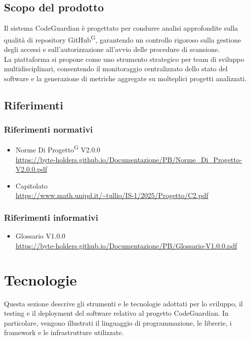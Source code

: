 \documentclass[a4paper, 11pt]{article}
\begin{document}
\subsection{Scopo del prodotto}
Il sistema CodeGuardian è progettato per condurre analisi approfondite sulla qualità di repository GitHub\textsuperscript{G}, garantendo un controllo rigoroso sulla gestione degli accessi e sull'autorizzazione all'avvio delle procedure di scansione.
\\
La piattaforma si propone come uno strumento strategico per team di sviluppo multidisciplinari, consentendo il monitoraggio centralizzato dello stato del software e la generazione di metriche aggregate su molteplici progetti analizzati.

\subsection{Riferimenti}
\subsubsection{Riferimenti normativi}
\begin{itemize}
  \item
    Norme Di Progetto\textsuperscript{G} V2.0.0\\
    \url{https://byte-holders.github.io/Documentazione/PB/Norme_Di_Progetto-V2.0.0.pdf}
  \item
    Capitolato\\
    \url{https://www.math.unipd.it/~tullio/IS-1/2025/Progetto/C2.pdf}
\end{itemize}
\subsubsection{Riferimenti informativi}
\begin{itemize}
  \item
    Glossario V1.0.0\\
    \url{https://byte-holders.github.io/Documentazione/PB/Glossario-V1.0.0.pdf}
\end{itemize}

\section{Tecnologie}
Questa sezione descrive gli strumenti e le tecnologie adottati per lo sviluppo, il testing e il deployment del software relativo al progetto CodeGuardian. In particolare, vengono illustrati il linguaggio di programmazione, le librerie, i framework e le infrastrutture utilizzate.
\end{document}
